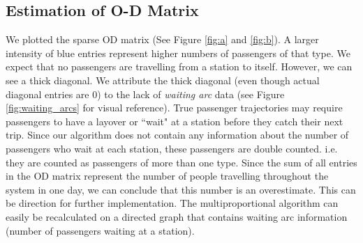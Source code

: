 \documentclass[11pt]{article}
\begin{document}
\subsection{Estimation of O-D Matrix}
\par We plotted the sparse OD matrix (See Figure \ref{fig:a} and \ref{fig:b}). A larger intensity of blue entries represent higher numbers of passengers of that type. We expect that no passengers are travelling from a station to itself. However, we can see a thick diagonal. We attribute the thick diagonal (even though actual diagonal entries are $0$) to the lack of \textit{waiting arc} data (see Figure \ref{fig:waiting_arcs} for visual reference). True passenger trajectories may require passengers to have a layover or ``wait" at a station before they catch their next trip. Since our algorithm does not contain any information about the number of passengers who wait at each station, these passengers are double counted. i.e. they are counted as passengers of more than one type. Since the sum of all entries in the OD matrix represent the number of people travelling throughout the system in one day, we can conclude that this number is an overestimate. This can be direction for further implementation. The multiproportional algorithm can easily be recalculated on a directed graph that contains waiting arc information (number of passengers waiting at a station).
\end{document}
